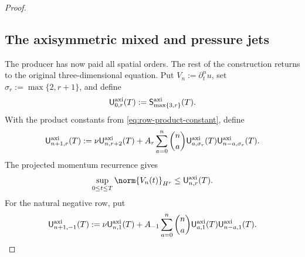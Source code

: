 \begin{proof}
\subsection{The axisymmetric mixed and pressure jets}

The producer has now paid all spatial orders.  The rest of the construction
returns to the original three-dimensional equation.  Put
\(V_n:=\partial_t^nu\), set \(\sigma_r:=\max\{2,r+1\}\), and define
\begin{equation}
 \mathsf U_{0,r}^{\rm axi}(T)
 :=\mathsf S_{\max\{3,r\}}^{\rm axi}(T).
 \label{eq:axisymmetric-row-base}
\end{equation}
With the product constants from \eqref{eq:row-product-constant}, define
\begin{equation}
 \mathsf U_{n+1,r}^{\rm axi}(T)
 :=\nu\mathsf U_{n,r+2}^{\rm axi}(T)
 +A_r\sum_{a=0}^{n}\binom na
 \mathsf U_{a,\sigma_r}^{\rm axi}(T)
 \mathsf U_{n-a,\sigma_r}^{\rm axi}(T).
 \label{eq:axisymmetric-row-recursion}
\end{equation}
The projected momentum recurrence gives
\begin{equation}
 \sup_{0\le t\le T}\norm{V_n(t)}_{H^r}
 \le\mathsf U_{n,r}^{\rm axi}(T).
 \label{eq:axisymmetric-row-bound}
\end{equation}
For the natural negative row, put
\begin{equation}
 \mathsf U_{n+1,-1}^{\rm axi}(T)
 :=\nu\mathsf U_{n,1}^{\rm axi}(T)
 +A_{-1}\sum_{a=0}^{n}\binom na
 \mathsf U_{a,1}^{\rm axi}(T)
 \mathsf U_{n-a,1}^{\rm axi}(T).
 \label{eq:axisymmetric-negative-row}
\end{equation}


\end{proof}
